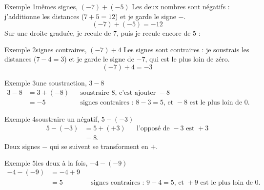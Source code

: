 \begin{exemple}{Exemple 1}{mêmes signes, $(-7) + (-5)$}
Les deux nombres sont négatifs : j'additionne les distances ($7 + 5 = 12$) et je garde
le signe $-$.
\[ (-7) + (-5) = -12 \]
Sur une droite graduée, je recule de $7$, puis je recule encore de $5$ :
\begin{center}
\end{center}
\end{exemple}

\begin{exemple}{Exemple 2}{signes contraires, $(-7) + 4$}
Les signes sont contraires : je soustrais les distances ($7 - 4 = 3$) et je garde le
signe de $-7$, qui est le plus loin de zéro.
\[ (-7) + 4 = -3 \]
\end{exemple}

\begin{exemple}{Exemple 3}{une soustraction, $3 - 8$}
\begin{align*}
  3 - 8 &= 3 + (-8) &&\text{soustraire } 8 \text{, c'est ajouter } -8 \\
        &= -5       &&\text{signes contraires : } 8 - 3 = 5 \text{, et } -8 \text{ est le plus loin de } 0.
\end{align*}
\end{exemple}

\begin{exemple}{Exemple 4}{soustraire un négatif, $5 - (-3)$}
\begin{align*}
  5 - (-3) &= 5 + (+3) &&\text{l'opposé de } -3 \text{ est } +3 \\
           &= 8.
\end{align*}
Deux signes $-$ qui se suivent se transforment en $+$.
\end{exemple}

\begin{exemple}{Exemple 5}{les deux à la fois, $-4 - (-9)$}
\begin{align*}
  -4 - (-9) &= -4 + 9 \\
            &= 5      &&\text{signes contraires : } 9 - 4 = 5 \text{, et } +9 \text{ est le plus loin de } 0.
\end{align*}
\end{exemple}

